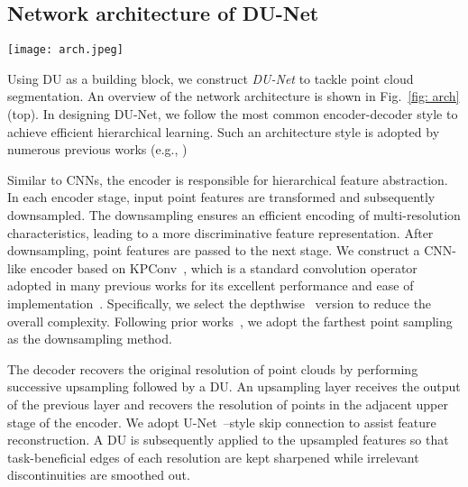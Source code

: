 \documentclass[a4paper,fleqn]{cas-dc}
\begin{document}
\subsection{Network architecture of DU-Net}\label{sec: arch}
\begin{figure*}[t]
    \centering
    \texttt{[image: arch.jpeg]}
    \caption{The network architecture used in this study and the computation flow of the discretized DU (Eq.~\eqref{eq: discretized_DU}). Top: the network architecture. Middle: computation flow of the DU. Here we assume the input is a point with a $d$-dimensional feature. $\sum$ and $\bigoplus$ denote neighborhood aggregation using summation and element-wise sum, respectively. }
    \label{fig: arch}
\end{figure*}

Using DU as a building block, we construct \textit{DU-Net} to tackle point cloud segmentation. An overview of the network architecture is shown in Fig.~\ref{fig: arch} (top). In designing DU-Net, we follow the most common encoder-decoder style to achieve efficient hierarchical learning. Such an architecture style is adopted by numerous previous works (e.g., \cite{qi2017pointnet++,thomas2019kpconv,xiang2021walk}) 

Similar to CNNs, the encoder is responsible for hierarchical feature abstraction. In each encoder stage, input point features are transformed and subsequently downsampled. The downsampling ensures an efficient encoding of multi-resolution characteristics, leading to a more discriminative feature representation. After downsampling, point features are passed to the next stage. We construct a CNN-like encoder based on KPConv~\cite{thomas2019kpconv}, which is a standard convolution operator adopted in many previous works for its excellent performance and ease of implementation~\cite{hu2020jsenet,lai2022stratified}. Specifically, we select the depthwise~\cite{sifre2014rigid} version to reduce the overall complexity. Following prior works~\cite{qi2017pointnet++,zhao2021point}, we adopt the farthest point sampling as the downsampling method.




The decoder recovers the original resolution of point clouds by performing successive upsampling followed by a DU. An upsampling layer receives the output of the previous layer and recovers the resolution of points in the adjacent upper stage of the encoder. We adopt U-Net~\cite{ronneberger2015u}--style skip connection to assist feature reconstruction. A DU is subsequently applied to the upsampled features so that task-beneficial edges of each resolution are kept sharpened while irrelevant discontinuities are smoothed out. 
\end{document}

